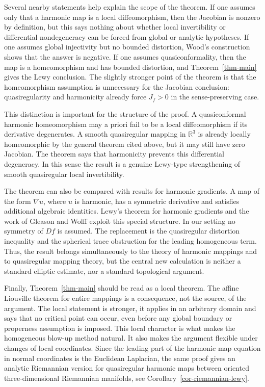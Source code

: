 \documentclass[10pt]{amsart}
\numberwithin{equation}{section}
\theoremstyle{definition}
\newcommand{\R}{\mathbb R}
\begin{document}
Several nearby statements help explain the scope of the theorem. If one assumes
only that a harmonic map is a local diffeomorphism, then the Jacobian is
nonzero by definition, but this says nothing about whether local invertibility
or differential nondegeneracy can be forced from global or analytic hypotheses.
If one assumes global injectivity but no bounded distortion, Wood's construction
shows that the answer is negative. If one assumes quasiconformality, then the
map is a homeomorphism and has bounded distortion, and
Theorem~\ref{thm-main} gives the Lewy conclusion. The slightly stronger point
of the theorem is that the homeomorphism assumption is unnecessary for the
Jacobian conclusion: quasiregularity and harmonicity already force
\(J_f>0\) in the sense-preserving case.

This distinction is important for the structure of the proof. A quasiconformal
harmonic homeomorphism may a priori fail to be a local diffeomorphism if its
derivative degenerates. A smooth quasiregular mapping in \(\R^3\) is already
locally homeomorphic by the general theorem cited above, but it may still have
zero Jacobian. The theorem says that harmonicity prevents this differential
degeneracy. In this sense the result is a genuine Lewy-type strengthening of
smooth quasiregular local invertibility.

The theorem can also be compared with results for harmonic gradients. A map of
the form \(\nabla u\), where \(u\) is harmonic, has a symmetric derivative and
satisfies additional algebraic identities. Lewy's theorem for harmonic
gradients and the work of Gleason and Wolff exploit this special structure. In
our setting no symmetry of \(Df\) is assumed. The replacement is the
quasiregular distortion inequality and the spherical trace obstruction for the
leading homogeneous term. Thus, the result belongs simultaneously to the theory
of harmonic mappings and to quasiregular mapping theory, but the central new
calculation is neither a standard elliptic estimate, nor a standard topological
argument.

Finally, Theorem~\ref{thm-main} should be read as a local theorem. The affine
Liouville theorem for entire mappings is a consequence, not the source, of the
argument. The local statement is stronger, it applies in an arbitrary domain
and says that no critical point can occur, even before any global boundary or
properness assumption is imposed. This local character is what makes the
homogeneous blow-up method natural. It also makes the argument flexible under
changes of local coordinates. Since the leading part of the harmonic map
equation in normal coordinates is the Euclidean Laplacian, the same proof gives
an analytic Riemannian version for quasiregular harmonic maps between oriented
three-dimensional Riemannian manifolds, see
Corollary~\ref{cor-riemannian-lewy}.
\end{document}

